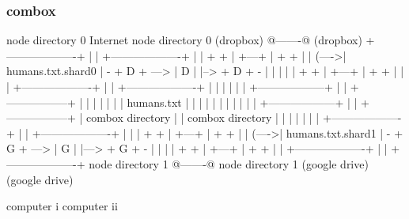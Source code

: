 \begin{frame}[fragile]
  \frametitle{combox}

  {\tiny
  \begin{semiverbatim}

         node directory 0                Internet              node directory 0
         (dropbox)                       @-------@             (dropbox)
        +-------------------+            |       |            +-------------------+
        |                   |    + +     | +---+ |     + +    |                   |
  (---->| humans.txt.shard0 | - + D + ---> | D | |--> + D + - |                   |
  |     |                   |    + +     | +---+ |     + +    |                   |
  |     +-------------------+            |       |            +-------------------+
  |                                      |       |
  |                                      |       |
 +------------------+                    |       |                        +-----------------+
 |                  |                    |       |                        |                 |
 |  humans.txt      |                    |       |                        |                 |
 |                  |                    |       |                        |                 |
 +------------------+                    |       |                        +-----------------+
  |  combox directory                    |       |                      combox directory
  |                                      |       |
  |                                      |       |
  |     +-------------------+            |       |             +-------------------+
  |     |                   |    + +     | +---+ |      + +    |                   |
  (---->| humans.txt.shard1 | - + G + ---> | G | |---> + G + - |                   |
        |                   |    + +     | +---+ |      + +    |                   |
        +-------------------+            |       |             +-------------------+
         node directory 1                @-------@              node directory 1
         (google drive)                                         (google drive)

  computer i                                                                    computer ii
  \end{semiverbatim}
  }

\end{frame}


